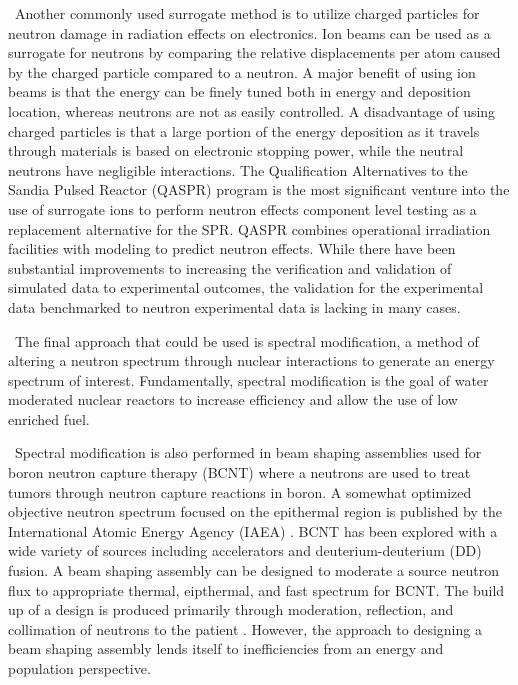 \ Another commonly used surrogate method is to utilize charged particles for neutron damage in radiation effects on electronics. 
Ion beams can be used as a surrogate for neutrons by comparing the relative displacements per atom caused by the charged particle compared to a neutron\cite{Galy2018}. 
A major benefit of using ion beams is that the energy can be finely tuned both in energy and deposition location, whereas neutrons are not as easily controlled. 
A disadvantage of using charged particles is that a large portion of the energy deposition as it travels through materials is based on electronic stopping power, while the neutral neutrons have negligible interactions. 
The Qualification Alternatives to the Sandia Pulsed Reactor (QASPR) program is the most significant venture into the use of surrogate ions to perform neutron effects component level testing as a replacement alternative for the SPR\cite{JointDefenseScienceBoard/ThreatReductionAdvisoryComitteeTaskForce2010}. 
QASPR combines operational irradiation facilities with modeling to predict neutron effects. 
While there have been substantial improvements to increasing the verification and validation of simulated data to experimental outcomes, the validation for the experimental data benchmarked to neutron experimental data is lacking in many cases\cite{Bouchard}.

\ The final approach that could be used is spectral modification,  a method of altering a neutron spectrum through nuclear interactions to generate an energy spectrum of interest. 
Fundamentally, spectral modification is the goal of water moderated nuclear reactors to increase efficiency and allow the use of low enriched fuel. 

\ Spectral modification is also performed in beam shaping assemblies used for boron neutron capture therapy (BCNT) where a neutrons are used to treat tumors through neutron capture reactions in boron. 
A somewhat optimized objective neutron spectrum focused on the epithermal region is published by the International Atomic Energy Agency (IAEA) \cite{Kasesaz2016}. 
BCNT has been explored with a wide variety of sources including accelerators and deuterium-deuterium (DD) fusion. 
A beam shaping assembly can be designed to moderate a source neutron flux to appropriate thermal, eipthermal, and fast spectrum for BCNT\cite{Ardana2017}. 
The build up of a design is produced primarily through moderation, reflection, and collimation of neutrons to the patient \cite{Zaidi2018}. 
However, the approach to designing a beam shaping assembly lends itself to inefficiencies from an energy and population perspective.  %

